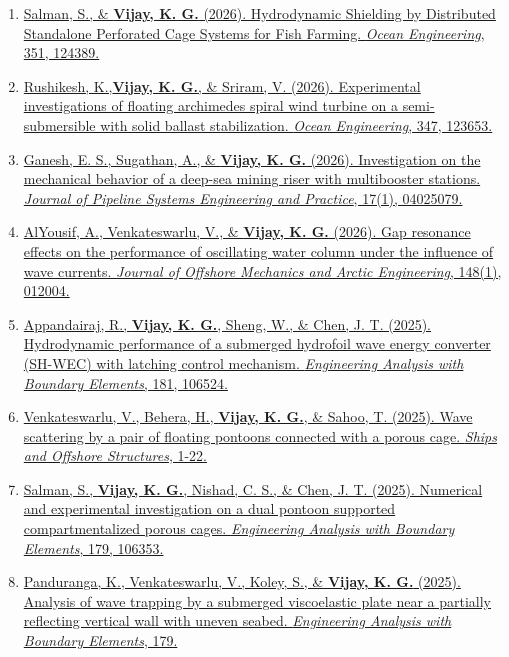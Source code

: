 \begin{enumerate}[label=\protect\circled{\arabic*}]
\item \href{https://doi.org/10.1016/j.oceaneng.2026.124389}{%
Salman, S., \& \textbf{Vijay, K. G.} (2026). Hydrodynamic Shielding by Distributed Standalone Perforated Cage Systems for Fish Farming. \textit{Ocean Engineering}, 351, 124389.}

\item \href{https://doi.org/10.1016/j.oceaneng.2025.123653}{%
Rushikesh, K.,\textbf{Vijay, K. G.}, \& Sriram, V. (2026). Experimental investigations of floating archimedes spiral wind turbine on a semi-submersible with solid ballast stabilization. \textit{Ocean Engineering}, 347, 123653.}

\item \href{https://doi.org/10.1061/JPSEA2.PSENG-1841}{%
Ganesh, E. S., Sugathan, A., \& \textbf{Vijay, K. G.} (2026). Investigation on the mechanical behavior of a deep-sea mining riser with multibooster stations. \textit{Journal of Pipeline Systems Engineering and Practice}, 17(1), 04025079.}


\item \href{https://doi.org/10.1115/1.4069057}{%
AlYousif, A., Venkateswarlu, V., \& \textbf{Vijay, K. G.} (2026). Gap resonance effects on the performance of oscillating water column under the influence of wave currents. \textit{Journal of Offshore Mechanics and Arctic Engineering}, 148(1), 012004.}

\item \href{https://doi.org/10.1016/j.enganabound.2025.106524}{%
Appandairaj, R., \textbf{Vijay, K. G.}, Sheng, W., \& Chen, J. T. (2025). Hydrodynamic performance of a submerged hydrofoil wave energy converter (SH-WEC) with latching control mechanism. \textit{Engineering Analysis with Boundary Elements}, 181, 106524.}

\item \href{https://doi.org/10.1080/17445302.2025.2453276}{%
Venkateswarlu, V., Behera, H., \textbf{Vijay, K. G.}, \& Sahoo, T. (2025). Wave scattering by a pair of floating pontoons connected with a porous cage. \textit{Ships and Offshore Structures}, 1-22. }

\item \href{https://doi.org/10.1016/j.enganabound.2025.106353}{%
Salman, S., \textbf{Vijay, K. G.}, Nishad, C. S., \& Chen, J. T. (2025). Numerical and experimental investigation on a dual pontoon supported compartmentalized porous cages. \textit{Engineering Analysis with Boundary Elements}, 179, 106353.}

\item \href{https://doi.org/10.1016/j.enganabound.2025.106370}{%
Panduranga, K., Venkateswarlu, V., Koley, S., \& \textbf{Vijay, K. G.} (2025). Analysis of wave trapping by a submerged viscoelastic plate near a partially reflecting vertical wall with uneven seabed. \textit{Engineering Analysis with Boundary Elements}, 179.}


\end{enumerate}
